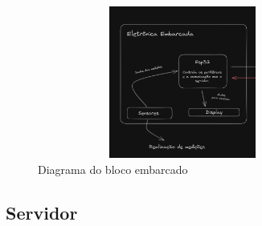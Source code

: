 \documentclass[11pt]{article}
\begin{document}
\begin{figure}[h]
	\centering
	\includegraphics[width=0.85\textwidth,height=5cm,keepaspectratio]{ee.png}
	\caption{Diagrama do bloco embarcado}
	\label{fig:ee}
\end{figure}


\subsection*{Servidor}
\end{document}
